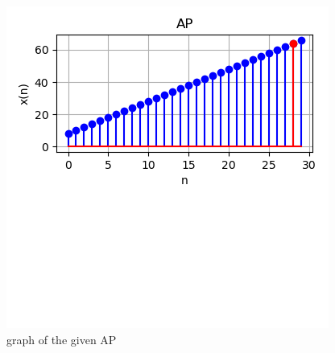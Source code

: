 \documentclass[journal,12pt,twocolumn]{IEEEtran}
\begin{document}
\begin{figure}[h!]
    \centering
    \includegraphics[width=\columnwidth]{figs/plot.png}
    \caption{graph of the given AP}
    \label{fig:1}
\end{figure}
\end{document}
